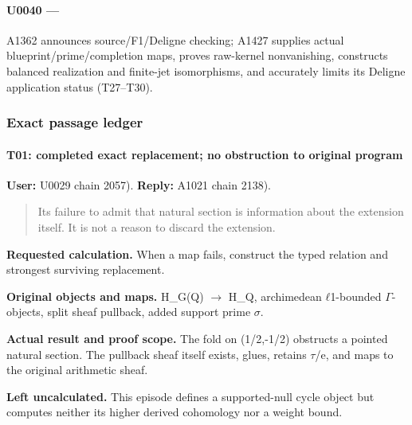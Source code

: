 \paragraph{\texorpdfstring{U0040 ---
\protect{}}{U0040 --- }}\label{u0040-a10456e9-7f72-4c81-bc00-118fcd575269}

A1362 announces source/F1/Deligne checking; A1427 supplies actual
blueprint/prime/completion maps, proves raw-kernel nonvanishing,
constructs balanced realization and finite-jet isomorphisms, and
accurately limits its Deligne application status (T27--T30).

\subsubsection{Exact passage ledger}\label{exact-passage-ledger}

\paragraph{T01: completed exact replacement; no obstruction to original
program}\label{t01-completed-exact-replacement-no-obstruction-to-original-program}

\textbf{User:} U0029
\protect{} chain 2057).
\textbf{Reply:} A1021
\protect{} chain 2138).

\begin{quote}
Its failure to admit that natural section is information about the
extension itself. It is not a reason to discard the extension.
\end{quote}

\textbf{Requested calculation.} When a map fails, construct the typed
relation and strongest surviving replacement.

\textbf{Original objects and maps.} H\_G(Q)
\allowbreak{}\ensuremath{→}\allowbreak{} H\_Q, archimedean
\allowbreak{}\ensuremath{ℓ}\allowbreak{}1-bounded
\allowbreak{}\ensuremath{Γ}\allowbreak{}-objects, split sheaf pullback,
added support prime \allowbreak{}\ensuremath{σ}\allowbreak{}.

\textbf{Actual result and proof scope.} The fold on (1/2,-1/2) obstructs
a pointed natural section. The pullback sheaf itself exists, glues,
retains \allowbreak{}\ensuremath{τ}\allowbreak{}/e, and maps to the
original arithmetic sheaf.

\textbf{Left uncalculated.} This episode defines a supported-null cycle
object but computes neither its higher derived cohomology nor a weight
bound.

